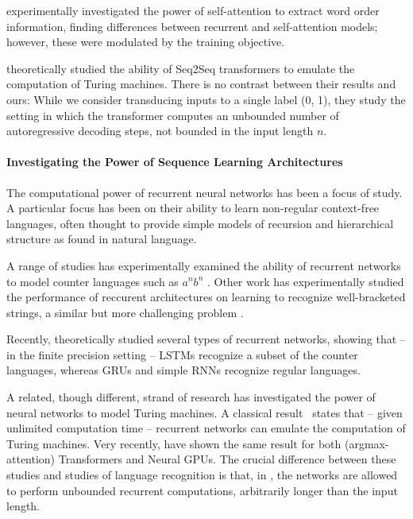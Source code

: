 \documentclass[11pt,a4paper]{article}
\begin{document}
\citet{yang2019assessing} experimentally investigated the power of self-attention to extract word order information, finding differences between recurrent and self-attention models; however, these were modulated by the training objective.

\citet{perez2019turing} theoretically studied the ability of Seq2Seq transformers to emulate the computation of Turing machines.
There is no contrast between their results and ours: While we consider transducing inputs to a single label (0, 1), they study the setting in which the transformer computes an unbounded number of autoregressive decoding steps, not bounded in the input length $n$.


\paragraph{Investigating the Power of Sequence Learning Architectures}
The computational power of recurrent neural networks has been a focus of study.
A particular focus has been on their ability to learn non-regular context-free languages, often thought to provide simple models of recursion and hierarchical structure as found in natural language.

A range of studies has experimentally examined the ability of recurrent networks to model counter languages such as $a^nb^n$ \cite{weiss2018practical,suzgun2019evaluating}.
Other work has experimentally studied the performance of reccurent architectures on learning to recognize well-bracketed strings, a similar but more challenging problem \cite{sennhauser2018evaluating,bernardy2018can}.

Recently, \citet{merrill2019sequential} theoretically studied several types of recurrent networks, showing that -- in the finite precision setting -- LSTMs recognize a subset of the counter languages, whereas GRUs and simple RNNs recognize regular languages.


A related, though different, strand of research has investigated the power of neural networks to model Turing machines.
A classical result~\cite{siegelman1991neural} states that -- given unlimited computation time -- recurrent networks can emulate the computation of Turing machines.
Very recently, \citet{perez2019turing} have shown the same result for both (argmax-attention) Transformers and Neural GPUs.
The crucial difference between these studies and studies of language recognition is that, in \citet{siegelman1991neural,perez2019turing}, the networks are allowed to perform unbounded recurrent computations, arbitrarily longer than the input length.
\end{document}
